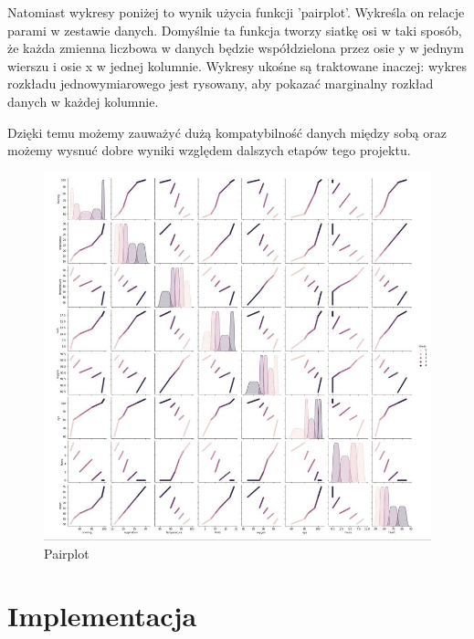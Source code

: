 \documentclass[12pt,a4paper]{article}
\begin{document}
		Natomiast wykresy poniżej to wynik użycia funkcji 'pairplot'. Wykreśla on relacje parami w zestawie danych.
        Domyślnie ta funkcja tworzy siatkę osi w taki sposób, że każda zmienna liczbowa w danych będzie współdzielona przez osie y w jednym wierszu i osie x w jednej kolumnie. Wykresy ukośne są traktowane inaczej: wykres rozkładu jednowymiarowego jest rysowany, aby pokazać marginalny rozkład danych w każdej kolumnie.
        
        Dzięki temu możemy zauważyć dużą kompatybilność danych między sobą oraz możemy wysnuć dobre wyniki względem dalszych etapów tego projektu.
		\begin{figure}[h!]
			\center	
			\includegraphics[width=1.1\textwidth]{img/pairplot.JPG}
			\caption{Pairplot}
		\end{figure}
	
	\pagebreak
	\section{Implementacja}
\end{document}
